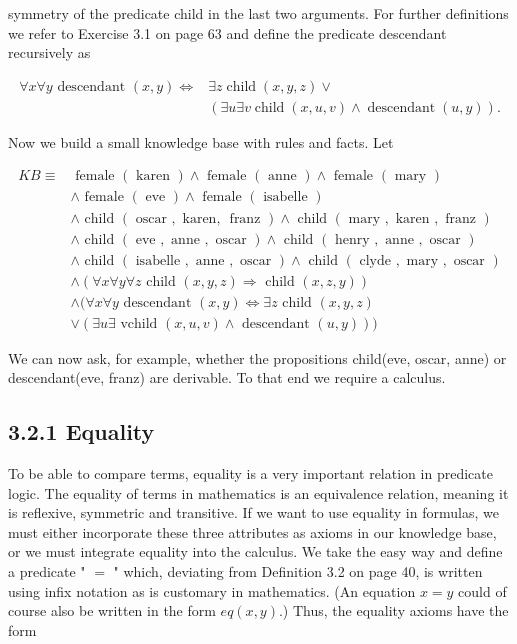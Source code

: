 \documentclass[10pt]{book}
\begin{document}
symmetry of the predicate child in the last two arguments. For further definitions we refer to Exercise 3.1 on page 63 and define the predicate descendant recursively as

$$
\begin{aligned}
\forall x \forall y \text { descendant }(x, y) \Leftrightarrow & \exists z \operatorname{child}(x, y, z) \vee \\
& (\exists u \exists v \operatorname{child}(x, u, v) \wedge \operatorname{descendant}(u, y)) .
\end{aligned}
$$

Now we build a small knowledge base with rules and facts. Let

$$
\begin{aligned}
K B \equiv & \text { female }(\text { karen }) \wedge \text { female }(\text { anne }) \wedge \text { female }(\text { mary }) \\
& \wedge \text { female }(\text { eve }) \wedge \text { female }(\text { isabelle }) \\
& \wedge \text { child }(\text { oscar }, \text { karen, } \text { franz }) \wedge \text { child }(\text { mary }, \text { karen }, \text { franz }) \\
& \wedge \text { child }(\text { eve }, \text { anne }, \text { oscar }) \wedge \text { child }(\text { henry }, \text { anne }, \text { oscar }) \\
& \wedge \text { child }(\text { isabelle }, \text { anne }, \text { oscar }) \wedge \text { child }(\text { clyde }, \text { mary }, \text { oscar }) \\
& \wedge(\forall x \forall y \forall z \text { child }(x, y, z) \Rightarrow \text { child }(x, z, y)) \\
& \wedge(\forall x \forall y \text { descendant }(x, y) \Leftrightarrow \exists z \text { child }(x, y, z) \\
& \vee(\exists u \exists \text { vchild }(x, u, v) \wedge \text { descendant }(u, y)))
\end{aligned}
$$

We can now ask, for example, whether the propositions child(eve, oscar, anne) or descendant(eve, franz) are derivable. To that end we require a calculus.

\subsection*{3.2.1 Equality}
To be able to compare terms, equality is a very important relation in predicate logic. The equality of terms in mathematics is an equivalence relation, meaning it is reflexive, symmetric and transitive. If we want to use equality in formulas, we must either incorporate these three attributes as axioms in our knowledge base, or we must integrate equality into the calculus. We take the easy way and define a predicate " $=$ " which, deviating from Definition 3.2 on page 40, is written using infix notation as is customary in mathematics. (An equation $x=y$ could of course also be written in the form $e q(x, y)$.) Thus, the equality axioms have the form
\end{document}
